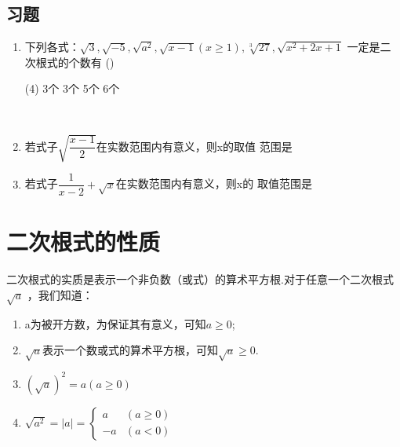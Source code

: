 \subsection{习题}
\begin{enumerate}
    \item  下列各式：$\sqrt{3}, \sqrt{-5},\sqrt{a^{2}} ,\sqrt{x-1}(x \geqslant 1) , \sqrt[3]{27} ,\sqrt{x^{2}+2 x+1}$
    一定是二次根式的个数有 (\qquad)
    \begin{tasks}(4)
        \task 3个
        \task 3个
        \task 5个
        \task 6个
    \end{tasks} \
    \item 若式子$\sqrt{\dfrac{x-1}{2}}$在实数范围内有意义，则x的取值 
    范围是    
    \item   若式子$\dfrac{1}{x-2}+\sqrt{x}$在实数范围内有意义，则x的  
    取值范围是 
    \end{enumerate}
    \section{二次根式的性质}
    二次根式的实质是表示一个非负数（或式）的算术平方根.对于任意一个二次根式$\sqrt{a}$ ，我们知道：
    \begin{enumerate}
       \item a为被开方数，为保证其有意义，可知$a \geq 0$;
       \item $\sqrt{a}$表示一个数或式的算术平方根，可知$\sqrt{a} \geq 0$.
       \item $(\sqrt{a})^{2}=a(a \geqslant 0)$
       \item $\sqrt{a^{2}}=|a|=\left\{\begin{array}{ll}{a} & {(a \geqslant 0)} \\ {-a} & {(a<0)}\end{array}\right.$
   \end{enumerate}
